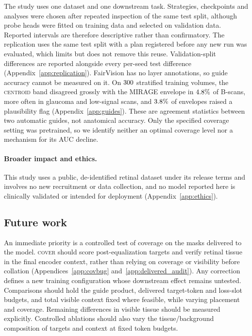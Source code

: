 \documentclass{article}
\newcommand{\ArmBest}{\textsc{centroid}}
\begin{document}
The study uses one dataset and one downstream task. Strategies, checkpoints
and analyses were chosen after repeated inspection of the same test split,
although probe heads were fitted on training data and selected on validation
data. Reported intervals are therefore descriptive rather than confirmatory.
The replication uses the same test split with a plan registered before any new
run was evaluated, which limits but does not remove this reuse.
Validation-split differences are reported alongside every per-seed test
difference (Appendix~\ref{app:replication}).
FairVision has no layer annotations, so guide accuracy cannot be measured on
it. On $300$ stratified training volumes, the \ArmBest{} band
disagreed grossly with the MIRAGE envelope in $4.8\%$ of B-scans, more often
in glaucoma and low-signal scans, and $3.8\%$ of envelopes raised a
plausibility flag (Appendix~\ref{app:guides}). These are agreement statistics
between two automatic guides, not anatomical accuracy. Only the specified
coverage setting was pretrained, so we identify neither an optimal coverage
level nor a mechanism for its AUC decline.

\paragraph{Broader impact and ethics.}
This study uses a public, de-identified retinal dataset under its release terms
and involves no new recruitment or data collection, and no model reported here
is clinically validated or intended for deployment (Appendix~\ref{app:ethics}).

\subsection{Future work}
\label{sec:future}

An immediate priority is a controlled test of coverage on the masks delivered
to the model. \textsc{cover} should score post-equalization targets and verify
retinal tissue in the final encoder context, rather than relying on coverage
or visibility before collation (Appendices~\ref{app:covbug}
and~\ref{app:delivered_audit}). Any correction defines a new training
configuration whose downstream effect remains untested.
Comparisons should hold the guide product, delivered target-token and
loss-slot budgets, and total visible context fixed where feasible, while
varying placement and coverage. Remaining differences in visible tissue
should be measured explicitly. Controlled ablations should also vary the
tissue/background composition of targets and context at fixed token budgets.
\end{document}

